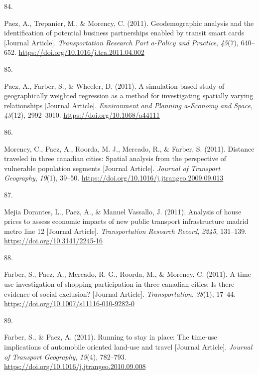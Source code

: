 \documentclass[10pt,a4paper,]{twentysecondcv}
\newlength{\csllabelwidth}
\newcommand{\CSLLeftMargin}[1]{\parbox[t]{\csllabelwidth}{#1}}
\newcommand{\CSLRightInline}[1]{\parbox[t]{\linewidth - \csllabelwidth}{#1}}
\begin{document}
\leavevmode{}%
\CSLLeftMargin{84. }%
\CSLRightInline{Paez, A., Trepanier, M., \& Morency, C. (2011).
Geodemographic analysis and the identification of potential business
partnerships enabled by transit smart cards {[}Journal Article{]}.
\emph{Transportation Research Part a-Policy and Practice}, \emph{45}(7),
640--652. \url{https://doi.org/10.1016/j.tra.2011.04.002}}

\leavevmode{}%
\CSLLeftMargin{85. }%
\CSLRightInline{Paez, A., Farber, S., \& Wheeler, D. (2011). A
simulation-based study of geographically weighted regression as a method
for investigating spatially varying relationships {[}Journal Article{]}.
\emph{Environment and Planning a-Economy and Space}, \emph{43}(12),
2992--3010. \url{https://doi.org/10.1068/a44111}}

\leavevmode{}%
\CSLLeftMargin{86. }%
\CSLRightInline{Morency, C., Paez, A., Roorda, M. J., Mercado, R., \&
Farber, S. (2011). Distance traveled in three canadian cities: Spatial
analysis from the perspective of vulnerable population segments
{[}Journal Article{]}. \emph{Journal of Transport Geography},
\emph{19}(1), 39--50.
\url{https://doi.org/10.1016/j.jtrangeo.2009.09.013}}

\leavevmode{}%
\CSLLeftMargin{87. }%
\CSLRightInline{Mejia Dorantes, L., Paez, A., \& Manuel Vassallo, J.
(2011). Analysis of house prices to assess economic impacts of new
public transport infrastructure madrid metro line 12 {[}Journal
Article{]}. \emph{Transportation Research Record}, \emph{2245},
131--139. \url{https://doi.org/10.3141/2245-16}}

\leavevmode{}%
\CSLLeftMargin{88. }%
\CSLRightInline{Farber, S., Paez, A., Mercado, R. G., Roorda, M., \&
Morency, C. (2011). A time-use investigation of shopping participation
in three canadian cities: Is there evidence of social exclusion?
{[}Journal Article{]}. \emph{Transportation}, \emph{38}(1), 17--44.
\url{https://doi.org/10.1007/s11116-010-9282-0}}

\leavevmode{}%
\CSLLeftMargin{89. }%
\CSLRightInline{Farber, S., \& Paez, A. (2011). Running to stay in
place: The time-use implications of automobile oriented land-use and
travel {[}Journal Article{]}. \emph{Journal of Transport Geography},
\emph{19}(4), 782--793.
\url{https://doi.org/10.1016/j.jtrangeo.2010.09.008}}
\end{document}

